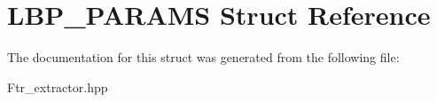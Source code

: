 \hypertarget{struct_l_b_p___p_a_r_a_m_s}{\section{L\+B\+P\+\_\+\+P\+A\+R\+A\+M\+S Struct Reference}
\label{struct_l_b_p___p_a_r_a_m_s}
}


The documentation for this struct was generated from the following file\+:\begin{DoxyCompactItemize}
\item 
Ftr\+\_\+extractor.\+hpp\end{DoxyCompactItemize}
